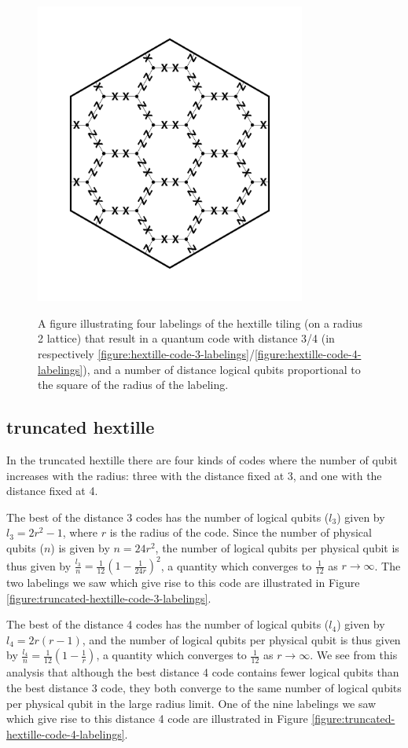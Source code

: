 \documentclass{amsbook}
\theoremstyle{plain}
\theoremstyle{definition}
\theoremstyle{remark}
\newcommand{\paren}[1]{\left(#1\right)}
\begin{document}
\begin{figure}
{\includegraphics[width=3.5in]{images/hextille-code-4-labeling-2} %
}
\caption{
\label{figure:hextille-code-labelings}
A figure illustrating four labelings of the hextille tiling (on a radius 2 lattice) that result in a quantum code with distance 3/4 (in respectively \ref{figure:hextille-code-3-labelings}/\ref{figure:hextille-code-4-labelings}), and a number of distance logical qubits proportional to the square of the radius of the labeling.
}
\end{figure}
\subsection{truncated hextille}

In the truncated hextille there are four kinds of codes where the number of qubit increases with the radius:  three with the distance fixed at 3, and one with the distance fixed at 4.

The best of the distance 3 codes has the number of logical qubits ($l_3$) given by $l_3=2r^2-1$, where $r$ is the radius of the code.  Since the number of physical qubits ($n$) is given by $n=24r^2$, the number of logical qubits per physical qubit is thus given by $\frac{l_3}{n}=\frac{1}{12}\paren{1-\frac{1}{24r}}^2$, a quantity which converges to $\frac{1}{12}$ as $r\to\infty$.  The two labelings we saw which give rise to this code are illustrated in Figure \ref{figure:truncated-hextille-code-3-labelings}.

The best of the distance 4 codes has the number of logical qubits ($l_4$) given by $l_4=2r(r-1)$, and the number of logical qubits per physical qubit is thus given by $\frac{l_4}{n}=\frac{1}{12}\paren{1-\frac{1}{r}}$, a quantity which converges to $\frac{1}{12}$ as $r\to\infty$.  We see from this analysis that although the best distance 4 code contains fewer logical qubits than the best distance 3 code, they both converge to the same number of logical qubits per physical qubit in the large radius limit.  One of the nine labelings we saw which give rise to this distance 4 code are illustrated in Figure \ref{figure:truncated-hextille-code-4-labelings}.
\end{document}
